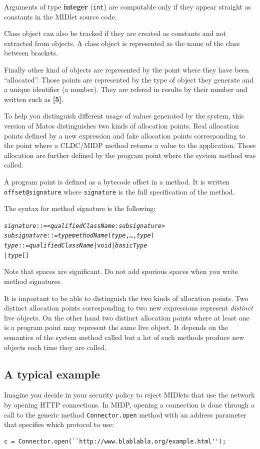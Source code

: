 Arguments of type \textbf{integer} (\texttt{int}) are computable only if
they appear straight as constants in the MIDlet source code.

Class object can also be tracked if they are created as constants and not
extracted from objects. A class object is represented as the name of the class
between brackets.

Finally other kind of objects are represented by the point where they have been
``allocated''. Those points are represented by the type of object they generate
and a unique identifier (a number). They are refered in results by their number 
and written such as \textbf{[5]}.

To help you distinguish different usage of values generated by the system, this version of Matos distinguishes two kinds of allocation points. Real allocation
points defined by a new expression and fake allocation points corresponding to
the point where a CLDC/MIDP method returns a value to the application. Those
allocation are further defined by the program point where the system method was
called.

A program point is defined as a bytecode offset in a method. It is
written \texttt{offset@signature} where \texttt{signature} is the full
specification of the method.

The syntax for method signature is the following:
\begin{alltt}
\textit{signature} ::= <\textit{qualifiedClassName}:\textvisiblespace\textit{subsignature}>
\textit{subsignature} ::= \textit{type}\textvisiblespace\textit{methodName}(\textit{type},\ldots,\textit{type})
\textit{type} ::= \textit{qualifiedClassName} | void | \textit{basicType}
     |  \textit{type}[]
\end{alltt}
Note that spaces are significant. Do not add spurious spaces when you write
method signatures.

It is important to be able to distinguish the two kinds of allocation points.
Two distinct allocation points corresponding to two new expressions represent
\emph{distinct} live objects. On the other hand two distinct allocation points
where at least one is a program point may represent the same live object. It
depends on the semantics of the system method called but a lot of such methods
produce new objects each time they are called.

\subsection{A typical example}
Imagine you decide in your security policy to reject MIDlets that use
the network by opening HTTP connections. 
In MIDP, opening a connection is done through a call to the generic method
\texttt{Connector.open} method with an address parameter that specifies 
which protocol to use:
\begin{verbatim}
c = Connector.open(``http://www.blablabla.org/example.html'');
\end{verbatim}

